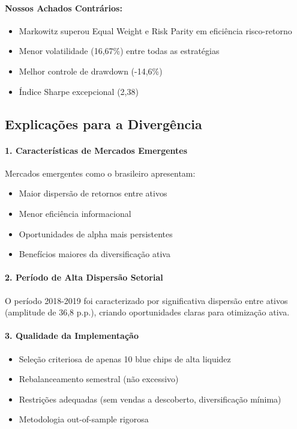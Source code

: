 \paragraph{Nossos Achados Contrários:}
\begin{itemize}
    \item Markowitz superou Equal Weight e Risk Parity em eficiência risco-retorno
    \item Menor volatilidade (16,67\%) entre todas as estratégias
    \item Melhor controle de drawdown (-14,6\%)
    \item Índice Sharpe excepcional (2,38)
\end{itemize}

\subsection{Explicações para a Divergência}

\paragraph{1. Características de Mercados Emergentes}
Mercados emergentes como o brasileiro apresentam:
\begin{itemize}
    \item Maior dispersão de retornos entre ativos
    \item Menor eficiência informacional
    \item Oportunidades de alpha mais persistentes
    \item Benefícios maiores da diversificação ativa
\end{itemize}

\paragraph{2. Período de Alta Dispersão Setorial}
O período 2018-2019 foi caracterizado por significativa dispersão entre ativos (amplitude de 36,8 p.p.), criando oportunidades claras para otimização ativa.

\paragraph{3. Qualidade da Implementação}
\begin{itemize}
    \item Seleção criteriosa de apenas 10 blue chips de alta liquidez
    \item Rebalanceamento semestral (não excessivo)
    \item Restrições adequadas (sem vendas a descoberto, diversificação mínima)
    \item Metodologia out-of-sample rigorosa
\end{itemize}

